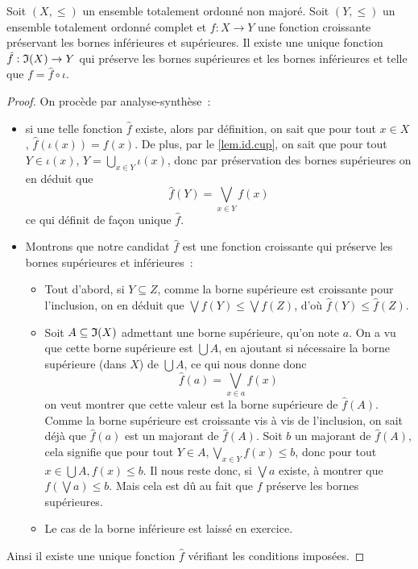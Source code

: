 \begin{theorem}
  Soit $(X,\leq)$ un ensemble totalement ordonné non majoré. Soit $(Y,\leq)$
  un ensemble totalement ordonné complet et $f : X \to Y$ une fonction
  croissante préservant les bornes inférieures et supérieures. Il existe une
  unique fonction $\hat f : \mathfrak{I}(X) \to Y$ qui préserve les bornes supérieures
  et les bornes inférieures et telle que $f = \hat f \circ \iota$.
\end{theorem}

\begin{proof}
  On procède par analyse-synthèse~:
  \begin{itemize}
  \item si une telle fonction $\hat f$ existe, alors par définition, on sait
    que pour tout $x\in X$, $\hat f(\iota(x)) = f(x)$. De plus, par le
    \cref{lem.id.cup}, on sait que pour tout $Y\in \iota(x)$,
    $\displaystyle Y = \bigcup_{x\in Y} \iota(x)$, donc par préservation des
    bornes supérieures on en déduit que
    \[\hat f(Y) = \bigvee_{x\in Y} f(x)\]
    ce qui définit de façon unique $\hat f$.
  \item Montrons que notre candidat $\hat f$ est une fonction croissante qui
    préserve les bornes supérieures et inférieures~:
    \begin{itemize}
    \item Tout d'abord, si
      $Y\subseteq Z$, comme la borne supérieure est croissante pour l'inclusion,
      on en déduit que $\bigvee f(Y) \leq \bigvee f(Z)$, d'où
      $\hat f(Y)\leq \hat f(Z)$.
      
    \item Soit $A\subseteq \mathfrak{I}(X)$ admettant une borne supérieure, qu'on note
      $a$. On a vu que cette borne supérieure est $\bigcup A$, en ajoutant si
      nécessaire la borne supérieure (dans $X$) de $\bigcup A$, ce qui nous
      donne donc
      \[\hat f(a) = \bigvee_{x \in a} f(x)\]
      on veut montrer que cette valeur est la borne supérieure de $\hat f(A)$.
      Comme la borne supérieure est croissante vis à vis de l'inclusion, on sait
      déjà que $\hat f(a)$ est un majorant de $\hat f(A)$.
      Soit $b$ un majorant de $\hat f(A)$, cela signifie que pour tout
      $Y\in A, \bigvee_{x \in Y} f(x) \leq b$, donc pour tout
      $x \in \bigcup A, f(x) \leq b$. Il nous reste donc, si $\bigvee a$ existe,
      à montrer que $f(\bigvee a) \leq b$. Mais cela est dû au fait que $f$
      préserve les bornes supérieures.
    \item Le cas de la borne inférieure est laissé en exercice.
    \end{itemize}
  \end{itemize}
  Ainsi il existe une unique fonction $\hat f$ vérifiant les conditions
  imposées.
\end{proof}

